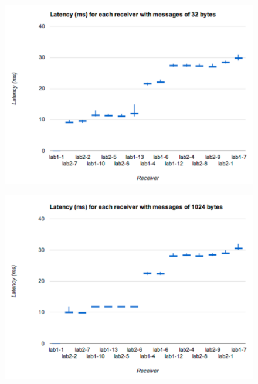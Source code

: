 \begin{figure}
\begin{center}
\begin{minipage}[b]{.5\textwidth}
\begin{center}
\includegraphics[width=\textwidth]{figures/LatencyPerReceiver-32b}
\end{center}
\label{fig:LatencyPerReceiver-32b}
\end{minipage}%
\begin{minipage}[b]{.5\textwidth}
\begin{center}
\includegraphics[width=\textwidth]{figures/LatencyPerReceiver-1024b}
\end{center}
\label{fig:LatencyPerReceiver-1024b}

\end{minipage}
\end{center}
\end{figure}
